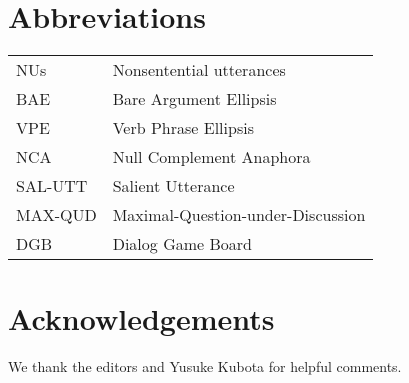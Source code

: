 \documentclass[output=paper
                ,modfonts
                ,nonflat
	        ,collection
	        ,collectionchapter
	        ,collectiontoclongg
 	        ,biblatex
                ,babelshorthands
                ,newtxmath
                ,draftmode
                ,colorlinks, citecolor=brown
]{./langsci/langscibook}
\begin{document}
{\section*{Abbreviations}

\begin{tabularx}{.99\textwidth}{@{}lX}
NUs & Nonsentential utterances\\
BAE & Bare Argument Ellipsis\\
VPE & Verb Phrase Ellipsis\\
NCA & Null Complement Anaphora\\
SAL-UTT & Salient Utterance\\
MAX-QUD & Maximal-Question-under-Discussion\\
DGB & Dialog Game Board\\
\end{tabularx}


\section*{Acknowledgements}
We thank the editors and Yusuke Kubota for helpful comments.

{\sloppy
\printbibliography[heading=subbibliography,notkeyword=this]
}

}%
\end{document}
